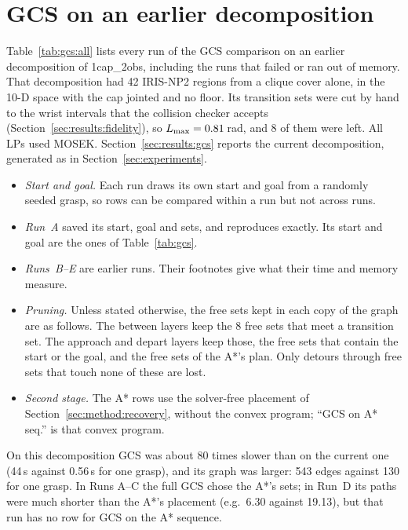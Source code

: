 \appendix
\section{GCS on an earlier decomposition}
\label{app:gcs}
Table~\ref{tab:gcs:all} lists every run of the GCS comparison on an earlier
decomposition of \textsf{1cap\_2obs}, including the runs that failed or ran
out of memory. That decomposition had 42 IRIS-NP2 regions from a clique cover
alone, in the 10-D space with the cap jointed and no floor. Its transition sets
were cut by hand to the wrist intervals that the collision checker accepts
(Section~\ref{sec:results:fidelity}), so $L_{\max}=0.81$\,rad, and 8 of them were
left. All LPs used MOSEK. Section~\ref{sec:results:gcs} reports the current
decomposition, generated as in Section~\ref{sec:experiments}.
\begin{itemize}
  \item \emph{Start and goal.} Each run draws its own start and goal from a
    randomly seeded grasp, so rows can be compared within a run but not across
    runs.
  \item \emph{Run~A} saved its start, goal and sets, and reproduces exactly.
    Its start and goal are the ones of Table~\ref{tab:gcs}.
  \item \emph{Runs~B--E} are earlier runs. Their footnotes give what their time
    and memory measure.
  \item \emph{Pruning.} Unless stated otherwise, the free sets kept in each copy
    of the graph are as follows. The between layers keep the 8 free sets that
    meet a transition set. The approach and depart layers keep those, the free
    sets that contain the start or the goal, and the free sets of the A*'s
    plan. Only detours through free sets that touch none of these are lost.
  \item \emph{Second stage.} The A* rows use the solver-free placement of
    Section~\ref{sec:method:recovery}, without the convex program; ``GCS on
    A* seq.'' is that convex program.
\end{itemize}
On this decomposition GCS was about 80 times slower than on the
current one (44\,s against 0.56\,s for one grasp), and its graph was larger:
543 edges against 130 for one grasp. In Runs A--C the full GCS chose the A*'s
sets; in Run~D its paths were much shorter than the A*'s placement (e.g.\ 6.30
against 19.13), but that run has no row for GCS on the A* sequence.

